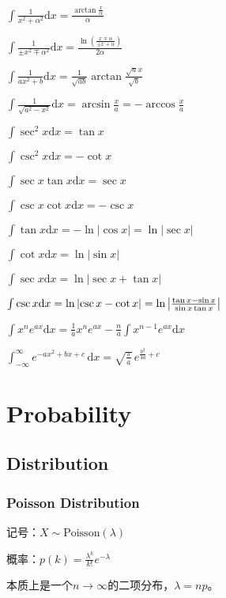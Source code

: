 \documentclass[9pt,landscape]{article}
\begin{document}
\begin{multicols}{3}
$ \int {\frac {1}{x^{2}+\alpha ^{2}}}{\mbox{d}}x={\frac {\arctan {\frac {x}{\alpha }}}{\alpha }} $

$ \int {\frac {1}{\pm x^{2}\mp \alpha ^{2}}}{\mbox{d}}x={\frac {\ln \left({\frac {x\mp \alpha }{\pm x+\alpha }}\right)}{2\alpha }} $

$ \int {\frac {1}{ax^{2}+b}}{\mbox{d}}x={\frac {1}{\sqrt {ab}}}\arctan {\frac {{\sqrt {a}}x}{\sqrt {b}}} $

$ \int {\frac {1}{\sqrt {a^{2}-x^{2}}}}{\mbox{d}}x=\arcsin {\frac {x}{a}}=-\arccos {\frac {x}{a}} $

$ \int \sec ^{2}x{\mbox{d}}x=\tan x $

$ \int \csc ^{2}x{\mbox{d}}x=-\cot x $

$ \int \sec x\tan x{\mbox{d}}x=\sec x $

$ \int \csc x\cot x{\mbox{d}}x=-\csc x $

$ \int \tan x{\mbox{d}}x=-\ln {\left|\cos {x}\right|}=\ln {\left|\sec x\right|} $

$ \int \cot x{\mbox{d}}x=\ln {\left|\sin x\right|} $

$ \int \sec x{\mbox{d}}x=\ln {\left|\sec x+\tan x\right|} $

$ \int \csc x{\mbox{d}}x=\ln {\left|\csc x-\cot x\right|}=\ln {\left|{\tan x-\sin x \over \sin x\tan x}\right|} $

$ \int x^{n}e^{ax}{\mbox{d}}x={\frac {1}{a}}x^{n}e^{ax}-{\frac {n}{a}}\int x^{n-1}e^{ax}{\mbox{d}}x $

$ \int _{-\infty }^{\infty }e^{-ax^{2}+bx+c}\,\mathrm{d}x={\sqrt {\frac {\pi }{a}}}\,e^{{\frac {b^{2}}{4a}}+c} $


\section{Probability}

\subsection{Distribution}

\subsubsection{Poisson Distribution}

记号：$X \sim \text{Poisson}(\lambda)$

概率：$p(k)=\frac{\lambda^k}{k!}e^{-\lambda}$

本质上是一个$n\to\infty$的二项分布，$\lambda=np$。


\end{multicols}
\end{document}
